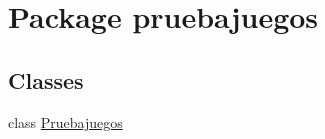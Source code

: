 \hypertarget{namespacepruebajuegos}{}\section{Package pruebajuegos}
\label{namespacepruebajuegos}
\subsection*{Classes}
\begin{DoxyCompactItemize}
\item 
class \mbox{\hyperlink{classpruebajuegos_1_1_pruebajuegos}{Pruebajuegos}}
\end{DoxyCompactItemize}
